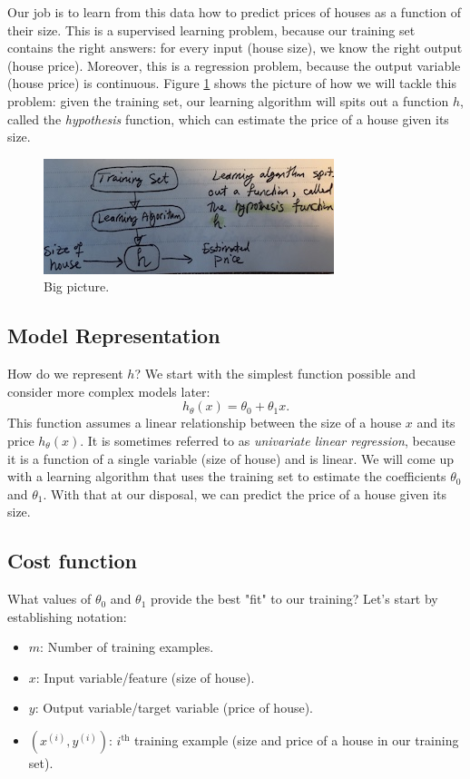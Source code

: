 \documentclass{article}
\begin{document}
Our job is to learn from this data how to predict prices of houses as a function of their size. This is a supervised learning problem, because our training set contains the right answers: for every input (house size), we know the right output (house price). Moreover, this is a regression problem, because the output variable (house price) is continuous. Figure \ref{linreg-bigpic} shows the picture of how we will tackle this problem: given the training set, our learning algorithm will spits out a function $h$, called the \textit{hypothesis} function, which can estimate the price of a house given its size.

\begin{figure}[ht]
\centering
\includegraphics[scale=0.8]{images/lin_reg/big-picture.jpg}
\caption{Big picture.}
\label{linreg-bigpic}
\end{figure}

\subsection{Model Representation}
How do we represent $h$? We start with the simplest function possible and consider more complex models later:
\begin{equation}
    h_{\theta}(x) = \theta_0 + \theta_1 x.
    \label{linreg-eq:univar-hypothesis}
\end{equation}
This function assumes a linear relationship between the size of a house $x$ and its price $h_{\theta}(x)$. It is sometimes referred to as \textit{univariate linear regression}, because it is a function of a single variable (size of house) and is linear. We will come up with a learning algorithm that uses the training set to estimate the coefficients $\theta_0$ and $\theta_1$. With that at our disposal, we can predict the price of a house given its size. 


\subsection{Cost function}
What values of $\theta_0$ and $\theta_1$ provide the best "fit" to our training? Let's start by establishing notation:
\begin{itemize}
    \item $m$: Number of training examples.
    \item $x$: Input variable/feature (size of house).
    \item $y$: Output variable/target variable (price of house).
    \item $(x^{(i)}, y^{(i)})$: $i^{\text{th}}$ training example (size and price of a house in our training set).
\end{itemize}
\end{document}

